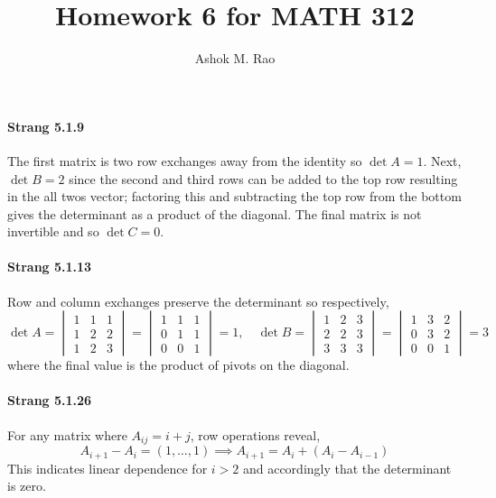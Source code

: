 \documentclass[10pt]{scrartcl}
\title{Homework 6 for MATH 312}
\author{Ashok M. Rao}
\begin{document}
\maketitle
{}

\paragraph{Strang 5.1.9} The first matrix is two row exchanges away from the identity so $\det{A} = 1$. Next, $\det{B} = 2$ since the second and third rows can be added to the top row resulting in the all twos vector; factoring this and subtracting the top row from the bottom gives the determinant as a product of the diagonal. The final matrix is not invertible and so $\det{C}=0$. 

\paragraph{Strang 5.1.13} Row and column exchanges preserve the determinant so respectively,
\[\det{A}=\begin{vmatrix}
1& 1& 1\\
1& 2& 2\\
1& 2& 3\end{vmatrix} =
\begin{vmatrix}
1& 1& 1\\
0& 1& 1\\
0& 0& 1\end{vmatrix} = 1,\quad 
\det{B}=\begin{vmatrix}
1& 2& 3\\
2& 2& 3\\
3& 3& 3\end{vmatrix} =
\begin{vmatrix}
1& 3& 2\\
0& 3& 2\\
0& 0& 1\end{vmatrix}=3\]
where the final value is the product of pivots on the diagonal.

\paragraph{Strang 5.1.26} For any matrix where $A_{ij} = i+j$, row operations reveal,
\[A_{i+1} - A_{i} = (1,\dots,1)\implies A_{i+1} = A_i + (A_i - A_{i-1})\] This indicates linear dependence for $i>2$ and accordingly that the determinant is zero.
\end{document}

